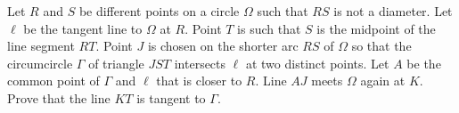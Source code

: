 Let 
$R$
 and 
$S$
 be different points on a circle 
$\Omega$
 such that 
$RS$
 is not a diameter. Let 
$\ell$
 be the tangent line to 
$\Omega$
 at 
$R$.
 Point 
$T$
 is such that 
$S$
 is the midpoint of the line segment 
$RT$.
 Point 
$J$
 is chosen on the shorter arc 
$RS$
 of 
$\Omega$
 so that the circumcircle 
$\Gamma$
 of triangle 
$JST$
 intersects 
$\ell$
 at two distinct points. Let 
$A$
 be the common point of 
$\Gamma$
 and 
$\ell$
 that is closer to 
$R$.
 Line 
$AJ$
 meets 
$\Omega$
 again at 
$K$.
 Prove that the line 
$KT$
 is tangent to 
$\Gamma$.
